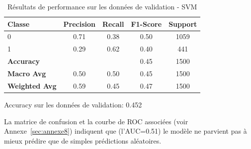 \begin{table}[H]
\centering
\caption{Résultats de performance sur les données de validation - SVM}
\label{tab:performance_validation_SVM}
\begin{tabular}{|l|c|c|c|c|}
\hline
\textbf{Classe}       & \textbf{Precision} & \textbf{Recall} & \textbf{F1-Score} & \textbf{Support} \\ \hline
0                     & 0.71               & 0.38            & 0.50              & 1059             \\ \hline
1                     & 0.29               & 0.62            & 0.40              & 441              \\ \hline
\textbf{Accuracy} & \multicolumn{2}{|c|}{} & 0.45       & 1500     \\ \hline
\textbf{Macro Avg}    & 0.50               & 0.50            & 0.45              & 1500             \\ \hline
\textbf{Weighted Avg} & 0.59               & 0.45            & 0.47              & 1500             \\ \hline
\end{tabular}
\begin{flushleft}
Accuracy sur les données de validation: 0.452
\end{flushleft}
\end{table}


\begin{flushleft}
La matrice de confusion et la courbe de ROC associées (voir Annexe~\ref{sec:annexe8}) indiquent que (l'AUC=0.51) le modèle ne parvient pas à mieux prédire que de simples prédictions aléatoires.
\end{flushleft}
 
